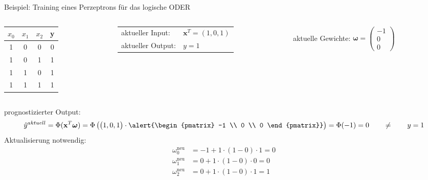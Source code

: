 \documentclass[11pt, aspectratio=169, t]{beamer}
\begin{document}
\begin{frame}{Beispiel: Training eines Perzeptrons für das logische ODER}
\begin{small}
\begin{columns}
\begin{column}{0.25\textwidth}
\hspace{0.5cm}
\begin{footnotesize}
\begin{tabular}{cccc} \toprule
$x_0$ & $x_1$ & $x_2$ & y \\ \midrule
1 & 0 & 0 & 0 \\
1 & 0 & 1 & 1 \\
1 & 1 & 0 & 1 \\
1 & 1 & 1 & 1 \\ \bottomrule
\end{tabular} \end{footnotesize}
\end{column}
\begin{column}{0.4\textwidth}
\begin{tabular}{ll}
aktueller Input: & $\mathbf{x}^{T} = (1, 0, 1)$ \\
aktueller Output: & $y=1$ \\
\end{tabular}
\end{column}
\begin{column}{0.4\textwidth}
aktuelle Gewichte: \alert{ $\boldsymbol{\omega} = \begin{pmatrix} -1 \\ 0 \\ 0 \end{pmatrix}$ }
\end{column}
\end{columns}
prognostizierter Output:
\[\hat{y}^{aktuell} = \Phi(\mathbf{x}^{T}\boldsymbol{\omega}) = \Phi\left( \begin{pmatrix} 1, 0, 1 \end{pmatrix}\cdot \alert{\begin{pmatrix} -1 \\ 0 \\ 0 \end{pmatrix}} \right) = \Phi(-1) = 0 \qquad \neq \qquad y = 1\]
Aktualisierung notwendig:
\begin{align*}
\omega_0^{\text{neu}} &= -1 + 1\cdot (1-0)\cdot 1 = 0 \\
\omega_1^{\text{neu}} &=  0 + 1\cdot (1-0)\cdot 0 = 0 \\
\omega_2^{\text{neu}} &=  0 + 1\cdot (1-0)\cdot 1 = 1
\end{align*}
\end{small}
\end{frame}
\end{document}
